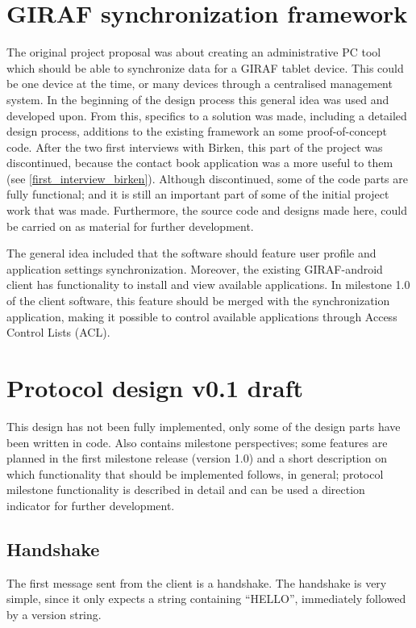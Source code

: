 \section{GIRAF synchronization framework}
The original project proposal was about creating an administrative PC tool which should be able to synchronize data for a GIRAF tablet device. This could be one device at the time, or many devices through a centralised management system. In the beginning of the design process this general idea was used and developed upon. From this, specifics to a solution was made, including a detailed design process, additions to the existing framework an some proof-of-concept code. After the two first interviews with Birken, this part of the project was discontinued, because the contact book application was a more useful to them (see \vref{first_interview_birken}). Although discontinued, some of the code parts are fully functional; and it is still an important part of some of the initial project work that was made. Furthermore, the source code and designs made here, could be carried on as material for further development. 

The general idea included that the software should feature user profile and application settings synchronization. Moreover, the existing GIRAF-android client has functionality to install and view available applications. In milestone 1.0 of the client software, this feature should be merged with the synchronization application, making it possible to control available applications through Access Control Lists (ACL).

\section{Protocol design v0.1 draft}
This design has not been fully implemented, only some of the design parts have been written in code. Also contains milestone perspectives; some features are planned in the first milestone release (version 1.0) and a short description on which functionality that should be implemented follows, in general; protocol milestone functionality is described in detail and can be used a direction indicator for further development.  

\subsection{Handshake}
The first message sent from the client is a handshake. The handshake is very simple, since it only expects a string containing ``HELLO'', immediately followed by a version string.

